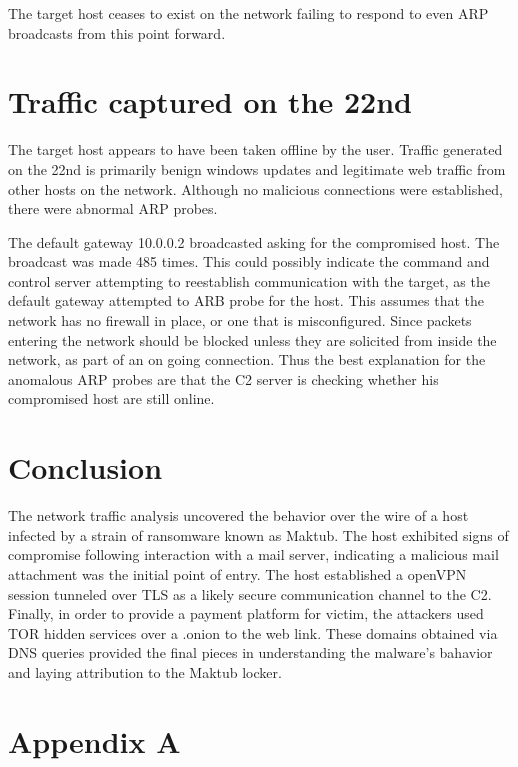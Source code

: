 \documentclass[11pt]{diazessay} %
\begin{document}
The target host ceases to exist on the network failing to respond to even ARP broadcasts from this point forward. 


\section*{Traffic captured on the 22nd}

The target host appears to have been taken offline by the user. Traffic generated on the 22nd is primarily benign windows updates and legitimate web traffic from other hosts on the network. Although no malicious connections were established, there were abnormal ARP probes.

The default gateway 10.0.0.2 broadcasted asking for the compromised host. The broadcast was made 485 times. This could possibly indicate the command and control server attempting to reestablish communication with the target, as the default gateway attempted to ARB probe for the host. This assumes that the network has no firewall in place, or one that is misconfigured. Since packets entering the network should be blocked unless they are solicited from inside the network, as part of an on going connection. Thus the best explanation for the anomalous ARP probes are that the C2 server is checking whether his compromised host are still online.




\section*{Conclusion}

The network traffic analysis uncovered the behavior over the wire of a host infected by a strain of ransomware known as Maktub. The host exhibited signs of compromise following interaction with a mail server, indicating a malicious mail attachment was the initial point of entry. The host established a openVPN session tunneled over TLS as a likely secure communication channel to the C2. Finally, in order to provide a payment platform for victim, the attackers used TOR hidden services over a .onion to the web link. These domains obtained via DNS queries provided the final pieces in understanding the malware's bahavior and laying attribution to the Maktub locker.


\clearpage
%



\pagebreak
\section*{Appendix A}


\end{document}
